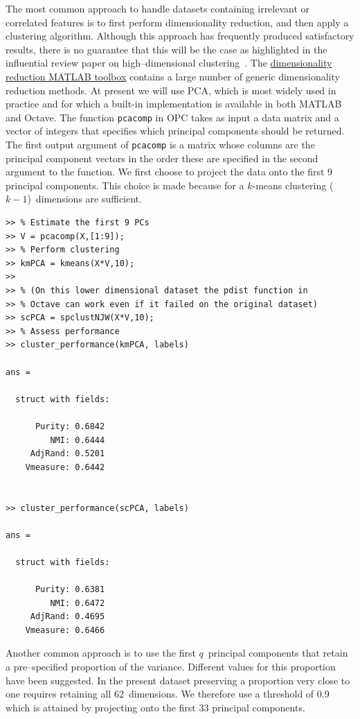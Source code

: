 \documentclass{book}
\begin{document}
The most common approach to handle datasets containing irrelevant or correlated
features is to first perform dimensionality reduction, and then apply a
clustering algorithm. Although this approach has frequently produced
satisfactory results, there is no guarantee that this will be the case as highlighted
in the influential review paper on high--dimensional clustering~\cite{KriegelKZ2009}.
%
The \href{https://lvdmaaten.github.io/drtoolbox/}{dimensionality reduction MATLAB
toolbox}
%
contains a large number of generic dimensionality reduction methods. At present we
will use PCA, which is most widely used in practice
and for which a built-in implementation is available in both MATLAB and Octave.
%
The function {\tt pcacomp} in OPC takes as input a data matrix and a vector
of integers that specifies which principal components should be returned.
The first output argument of
{\tt pcacomp} is a matrix whose columns are the principal
component vectors in the order these are specified in the second argument
to the function.
%
We first choose to project the data onto the first 9 principal
components. This choice is made because for a $k$-means clustering 
($k-1$)~dimensions are sufficient.

\begin{verbatim}
>> % Estimate the first 9 PCs
>> V = pcacomp(X,[1:9]);
>> % Perform clustering
>> kmPCA = kmeans(X*V,10);
>>
>> % (On this lower dimensional dataset the pdist function in
>> % Octave can work even if it failed on the original dataset)
>> scPCA = spclustNJW(X*V,10);
>> % Assess performance
>> cluster_performance(kmPCA, labels)

ans = 

  struct with fields:

      Purity: 0.6842
         NMI: 0.6444
     AdjRand: 0.5201
    Vmeasure: 0.6442


>> cluster_performance(scPCA, labels)

ans = 

  struct with fields:

      Purity: 0.6381
         NMI: 0.6472
     AdjRand: 0.4695
    Vmeasure: 0.6466

\end{verbatim}

\noindent
%
Another common approach is to use the first $q$~principal components that
retain a pre--specified proportion of the variance. Different values for this
proportion have been suggested. In the present dataset preserving a proportion
very close to one requires retaining all 62~dimensions.  We therefore use a
threshold of 0.9 which is attained by projecting onto the first 33 principal
components.
\end{document}
